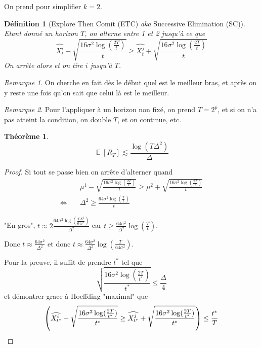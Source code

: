 \documentclass{article}
\DeclareMathOperator*{\E}{\mathbb{E}}
\let\P\relax
\DeclareMathOperator*{\P}{\mathbb{P}}
\newtheorem{definition}{Définition}[section]
\newtheorem{theorem}{Théorème}[section]
\theoremstyle{remark}
\theoremstyle{remark}
\newtheorem{remark}{Remarque}[section]
\begin{document}
On prend pour simplifier $k=2$.

\begin{definition}[Explore Then Comit (ETC) \textit{aka} Successive Elimination (SC)]
   Etant donné un horizon $T$, on alterne entre 1 et 2 jusqu'à ce que
   $$
   \widehat{X_t^i} - \sqrt{\frac{16 \sigma^2 \log(\frac{2 T}{t})}{t}} \geq \widehat{X_t^j} + \sqrt{\frac{16 \sigma^2 \log(\frac{2 T}{t})}{t}}
   $$
   On arrête alors et on tire $i$ jusqu'à $T$.
\end{definition}

\begin{remark}
   On cherche en fait dès le début quel est le meilleur bras, et après on y reste une fois qu'on sait que celui là est le meilleur.
\end{remark}

\begin{remark}
   Pour l'appliquer à un horizon non fixé, on prend $T = 2^p$, et si on n'a pas atteint la condition, on double $T$, et on continue, etc.
\end{remark}

\begin{theorem}
   $$
   \E[R_T] \lesssim \frac{\log(T \Delta^2)}{\Delta}
   $$
\end{theorem}

\begin{proof}
   Si tout se passe bien on arrête d'alterner quand
   \begin{align*}
      & \mu^1 - \sqrt{\frac{16 \sigma^2 \log(\frac{2 T}{t})}{t}} \geq \mu^2 + \sqrt{\frac{16 \sigma^2 \log(\frac{2 T}{t})}{t}} \\
      \Leftrightarrow \quad & \Delta^2 \geq \frac{64 \sigma^2 \log(\frac{T}{t})}{t}
   \end{align*}

   "En gros", $t \approx 2 \frac{64 \sigma^2 \log(\frac{T \Delta^2}{64 \sigma^2})}{\Delta^2}$ car $t \geq \frac{64 \sigma^2}{\Delta^2} \log(\frac{T}{t})$.

   Donc $t \approx \frac{64 \sigma^2}{\Delta^2}$ et donc $t \approx \frac{64 \sigma^2}{\Delta^2} \log(\frac{T}{64 \sigma^2})$.

   Pour la preuve, il suffit de prendre $t^*$ tel que
   $$
   \sqrt{\frac{16 \sigma^2 \log(\frac{2 T}{t^*})}{t^*}} \leq \frac{\Delta}{4}
   $$
   et démontrer grace à Hoeffding "maximal" que
   $$
   \P\left( \widehat{X_{t^*}^i} - \sqrt{\frac{16 \sigma^2 \log(\frac{2 T}{t^*})}{t^*}} \geq \widehat{X_{t^*}^j} + \sqrt{\frac{16 \sigma^2 \log(\frac{2 T}{t^*})}{t^*}} \right) \leq \frac{t^*}{T}
   $$

\end{proof}
\end{document}
